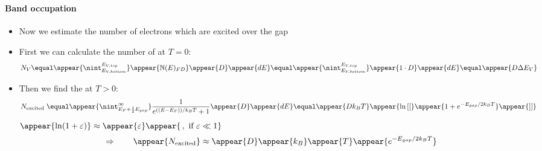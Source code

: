 \begin{frame}
\frametitle{\texorpdfstring{\culine[\sectiontitleulinecolor]{\sectiontitle}}{\sectiontitle} }
\framesubtitle{Band occupation}

\begin{itemize}
	\item Now we estimate the number of electrons which are excited over the gap 

\item First we can calculate the number of  at $T=0$:
\[
N_{V}  \equal \appear{\nint_{E_{V, bottom}}^{E_{V, top}}}  \appear{\mathbb{N} (E)_{F D}} \appear{D} \appear{d E} \equal \appear{\nint_{E_{V, bottom}}^{E_{V, top}}} \appear{1 \cdot D} \appear{d E} \equal \appear{D \Delta E_{V}}
\]

\item Then we find the  at $T>0$:
\[
N_{\text {excited }}  \equal \appear{\nint_{E_{F}+\frac{1}{2} E_{g a p}}^{\infty}} \frac{1}{e^{ \textrm{((}E-E_{F} \textrm{))} / k_{B} T}+1} \appear{D} \appear{d E} \equal \appear{D k_{B} T} \appear{\ln  \textrm{[[}}\appear{1+e^{-E_{g a p} / 2 k_{B} T}} \appear{\textrm{]]}}
\]
 $\appear{\ln (1+\varepsilon)} \approx \appear{\varepsilon}\appear{\,, \text { if } \varepsilon \ll 1} $
$$
\Rightarrow \qquad \appear{N_{\text {excited}}} \approx \appear{D} \appear{k_{B}} \appear{T} \appear{e^{-E_{gap} / 2 k_{B} T}}
$$
\end{itemize}

\endofslide 
\end{frame}


